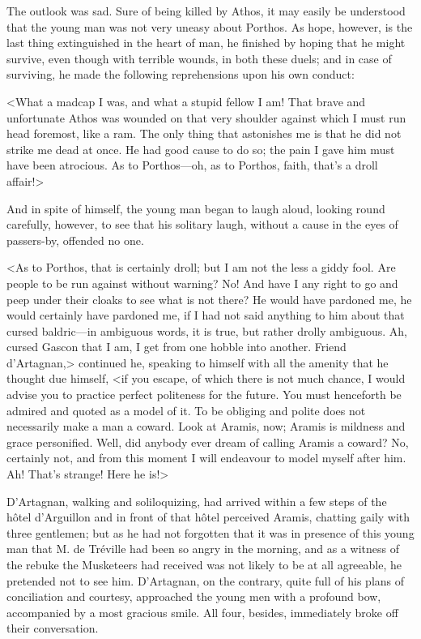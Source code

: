 The outlook was sad. Sure of being killed by Athos, it may easily be understood that the young man was not very uneasy about Porthos. As hope, however, is the last thing extinguished in the heart of man, he finished by hoping that he might survive, even though with terrible wounds, in both these duels; and in case of surviving, he made the following reprehensions upon his own conduct: 

<What a madcap I was, and what a stupid fellow I am! That brave and unfortunate Athos was wounded on that very shoulder against which I must run head foremost, like a ram. The only thing that astonishes me is that he did not strike me dead at once. He had good cause to do so; the pain I gave him must have been atrocious. As to Porthos---oh, as to Porthos, faith, that's a droll affair!> 

And in spite of himself, the young man began to laugh aloud, looking round carefully, however, to see that his solitary laugh, without a cause in the eyes of passers-by, offended no one. 

<As to Porthos, that is certainly droll; but I am not the less a giddy fool. Are people to be run against without warning? No! And have I any right to go and peep under their cloaks to see what is not there? He would have pardoned me, he would certainly have pardoned me, if I had not said anything to him about that cursed baldric---in ambiguous words, it is true, but rather drolly ambiguous. Ah, cursed Gascon that I am, I get from one hobble into another. Friend d'Artagnan,> continued he, speaking to himself with all the amenity that he thought due himself, <if you escape, of which there is not much chance, I would advise you to practice perfect politeness for the future. You must henceforth be admired and quoted as a model of it. To be obliging and polite does not necessarily make a man a coward. Look at Aramis, now; Aramis is mildness and grace personified. Well, did anybody ever dream of calling Aramis a coward? No, certainly not, and from this moment I will endeavour to model myself after him. Ah! That's strange! Here he is!> 

D'Artagnan, walking and soliloquizing, had arrived within a few steps of the hôtel d'Arguillon and in front of that hôtel perceived Aramis, chatting gaily with three gentlemen; but as he had not forgotten that it was in presence of this young man that M. de Tréville had been so angry in the morning, and as a witness of the rebuke the Musketeers had received was not likely to be at all agreeable, he pretended not to see him. D'Artagnan, on the contrary, quite full of his plans of conciliation and courtesy, approached the young men with a profound bow, accompanied by a most gracious smile. All four, besides, immediately broke off their conversation. 

